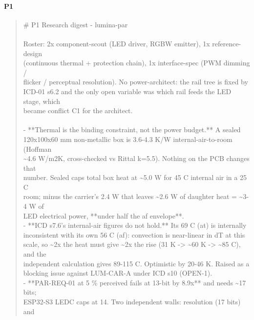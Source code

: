 \documentclass[11pt,a4paper]{article}
\begin{document}
\paragraph*{P1}
\begin{quote}\small\ttfamily\raggedright
\# P1 Research digest - lumina-par\\
~\\
Roster: 2x component-scout (LED driver, RGBW emitter), 1x reference-design\\
(continuous thermal + protection chain), 1x interface-spec (PWM dimming /\\
flicker / perceptual resolution). No power-architect: the rail tree is fixed by\\
ICD-01 s6.2 and the only open variable was which rail feeds the LED stage, which\\
became conflict C1 for the architect.\\
~\\
- {*}{*}Thermal is the binding constraint, not the power budget.{*}{*} A sealed\\
  120x100x60 mm non-metallic box is 3.6-4.3 K/W internal-air-to-room (Hoffman\\
  \textasciitilde{}4.6 W/m2K, cross-checked vs Rittal k=5.5). Nothing on the PCB changes that\\
  number. Sealed caps total box heat at \textasciitilde{}5.0 W for 45 C internal air in a 25 C\\
  room; minus the carrier's 2.4 W that leaves \textasciitilde{}2.6 W of daughter heat = \textasciitilde{}3-4 W of\\
  LED electrical power, {*}{*}under half the af envelope{*}{*}.\\
- {*}{*}ICD s7.6's internal-air figures do not hold.{*}{*} Its 69 C (at) is internally\\
  inconsistent with its own 56 C (af): convection is near-linear in dT at this\\
  scale, so \textasciitilde{}2x the heat must give \textasciitilde{}2x the rise (31 K -\textgreater{} \textasciitilde{}60 K -\textgreater{} \textasciitilde{}85 C), and the\\
  independent calculation gives 89-115 C. Optimistic by 20-46 K. Raised as a\\
  blocking issue against LUM-CAR-A under ICD s10 (OPEN-1).\\
- {*}{*}PAR-REQ-01 at 5 \% perceived fails at 13-bit by 8.9x{*}{*} and needs \textasciitilde{}17 bits;\\
  ESP32-S3 LEDC caps at 14. Two independent walls: resolution (17 bits) and\\

\end{quote}
\end{document}
